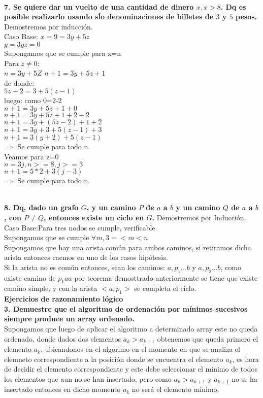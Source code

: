 \documentclass[12pt,a4paper]{article}
\begin{document}
\\\textbf{7. Se quiere dar un vuelto de una cantidad de dinero $x, x > 8$. Dq es posible realizarlo usando s\'lo denominaciones de billetes de $3$ y $5$ pesos.}
Demostremos por inducci\'on.\\
Caso Base:
$x=9=3y+5z$\\
$y=3 y z=0$\\
Supongamos que se cumple para x=n\\
Para $z\neq 0$:\\
$n=3y+5Z$
$n+1=3y + 5z +1$\\
de donde:\\
$5z-2=3+5(z-1)$\\
luego: como 0=2-2\\
$n+1=3y + 5z +1 + 0$\\
$n+1=3y + 5z +1 +2-2$\\
$n+1=3y + (5z-2) +1 +2$\\
$n+1=3y + 3+5(z-1) +3$\\
$n+1=3(y+2)+5(z-1)$\\
$\Rightarrow$ Se cumple para todo n.
\\ Veamos para z=0\\
$n=3j, n>= 8,j>=3 $\\
$n+1=5*2+3(j-3)$\\
$\Rightarrow$ Se cumple para todo n.

\\\textbf{8. Dq, dado un grafo $G$, y un camino $P$ de $a$ a $b$ y un camino $Q$ de $a$ a $b$, con $P \neq Q$, entonces existe un ciclo en $G$.}
Demostremos por Inducci\'on.\\
Caso Base:Para tres nodos se cumple, verificable\\
Supongamos que se cumple $\forall m, 3=<m<n$\\
Supongamos que hay una arista com\'un para ambos caminos, si retiramos dicha arista entonces caemos en uno de los casos hip\'otesis.\\
Si la arista no es com\'un entonces, sean los caminos: $a,p_{1}...b$ y $a,p_{2}...b$, como existe camino de $p_{1} a a$ por teorema demosttrado anteriormente se tiene que existe camino simple, y con la arista $<a,p_{1}>$ se completa el ciclo.\\
\textbf{Ejercicios de razonamiento l\'ogico}\\
\textbf{3. Demuestre que el algoritmo de ordenaci\'on por m\'inimos sucesivos siempre produce un array ordenado.}\\
Supongamos que luego de aplicar el algoritmo a determinado array este no queda ordenado, donde dados dos elementos $a_{k} > a_{k+1}$ obtenemos que queda primero el elemento $a_{k}$, ubicandonos en el algorimo en el momento en que se analiza el elemneto correspondiente a la posici\'on donde se encuentra el elemento $a_{k}$, es hora de decidir el elemento correspondiente y este debe seleccionar el m\'inimo de todos los elementos que aun no se han insertado, pero como
$a_{k} > a_{k+1}$ y $a_{k+1}$ no se ha insertado entonces en dicho momento $a_{k}$ no ser\'a el elemento m\'inimo.\\
\end{document}
